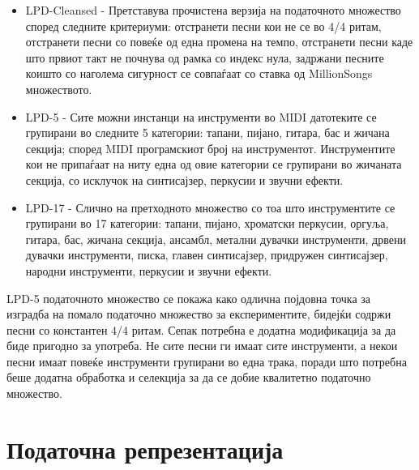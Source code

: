 \begin{itemize}
    \item LPD-Cleansed - Претставува прочистена верзија на податочното множество според следните критериуми: отстранети песни кои не се во 4/4 ритам, отстранети песни со повеќе од една промена на темпо, отстранети песни каде што првиот такт не почнува од рамка со индекс нула, задржани песните коишто со наголема сигурност се совпаѓаат со ставка од MillionSongs множеството.
    \item LPD-5 - Сите можни инстанци на инструменти во MIDI датотеките се групирани во следните 5 категории: тапани, пијано, гитара, бас и жичана секција; според MIDI програмскиот број на инструментот. Инструментите кои не припаѓаат на ниту една од овие категории се групирани во жичаната секција, со исклучок на синтисајзер, перкусии и звучни ефекти.
    \item LPD-17 - Слично на претходното множество со тоа што инструментите се групирани во 17 категории: тапани, пијано, хроматски перкусии, оргуља, гитара, бас, жичана секција, ансамбл, метални дувачки инструменти, дрвени дувачки инструменти, писка, главен синтисајзер, придружен синтисајзер, народни инструменти, перкусии и звучни ефекти.
\end{itemize}

LPD-5 податочното множество се покажа како одлична појдовна точка за изградба на помало податочно множество за експериментите, бидејќи содржи песни со константен 4/4 ритам. Сепак потребна е додатна модификација за да биде пригодно за употреба. Не сите песни ги имаат сите инструменти, а некои песни имаат повеќе инструменти групирани во една трака, поради што потребна беше додатна обработка и селекција за да се добие квалитетно податочно множество.

\section{Податочна репрезентација}

